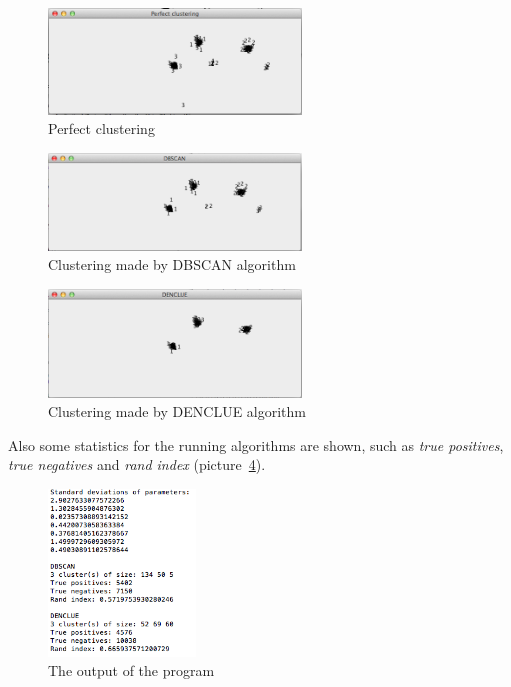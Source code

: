 \documentclass[12pt, a4paper, notitlepage, oneside]{article}
\begin{document}
\begin{figure}[!ht]
 	\centering
	\includegraphics[width=0.6\textwidth]{images/perfect.png}
 	\caption[]
	{Perfect clustering}
	\label{perfect}
	\end{figure}

\begin{figure}[!ht]
 	\centering
	\includegraphics[width=0.6\textwidth]{images/dbscan.png}
 	\caption[]
	{Clustering made by DBSCAN algorithm}
	\label{dbscan}
	\end{figure}

\begin{figure}[!ht]
 	\centering
	\includegraphics[width=0.6\textwidth]{images/denclue.png}
 	\caption[]
	{Clustering made by DENCLUE algorithm}
		\label{denclue}
	\end{figure}

Also some statistics for the running algorithms are shown, such as \textit{true positives}, \textit{true negatives} and \textit{rand index} (picture~\ref{result}).

\begin{figure}[!ht]
 	\centering
	\includegraphics[width=0.35\textwidth]{images/results.png}
 	\caption[]
	{The output of the program}
		\label{result}
\end{figure}
\end{document}
